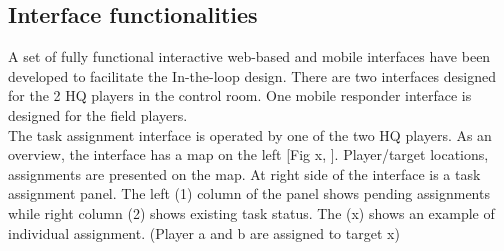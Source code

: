 \subsection{Interface functionalities}
A set of fully functional interactive web-based and mobile interfaces have been developed to facilitate the In-the-loop design. There are two interfaces designed for the 2 HQ players in the control room. One mobile responder interface is designed for the field players. \\

The task assignment interface is operated by one of the two HQ players. As an overview, the interface has a map on the left [Fig x, ]. Player/target locations, assignments are presented on the map. At right side of the interface is a task assignment panel. The left (1) column of the panel shows pending assignments while right column (2) shows existing task status. The (x) shows an example of individual assignment. (Player a and b are assigned to target x)\\

